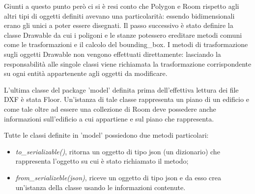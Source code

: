 \documentclass[12pt]{report}
\begin{document}
Giunti a questo punto però ci si è resi conto che Polygon e Room rispetto agli altri tipi di oggetti definiti avevano una particolarità: essendo bidimensionali erano gli unici a poter essere disegnati.
Il passo successivo è stato definire la classe Drawable da cui i poligoni e le stanze potessero ereditare metodi comuni come le trasformazioni e il calcolo del bounding\_box.
I metodi di trasformazione sugli oggetti Drawable non vengono effettuati direttamente: lasciando la responsabilità alle singole classi viene richiamata la trasformazione corrispondente su ogni entità appartenente agli oggetti da modificare.

L'ultima classe del package 'model' definita prima dell'effettiva lettura dei file DXF è stata Floor. Un'istanza di tale classe rappresenta un piano di un edificio e come tale oltre ad essere una collezione di Room deve possedere anche informazioni sull'edificio a cui appartiene e sul piano che rappresenta.

Tutte le classi definite in 'model' possiedono due metodi particolari:
\begin{itemize}
\item \textit{to\_serializable()}, ritorna un oggetto di tipo json (un dizionario) che rappresenta l'oggetto su cui è stato richiamato il metodo;
\item \textit{from\_serializeble(json)}, riceve un oggetto di tipo json e da esso crea un'istanza della classe usando le informazioni contenute.

\end{itemize}


\vspace{5mm} %
\end{document}
